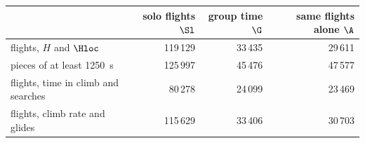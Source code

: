 \begin{tabular}{@{}l r r r@{}}
\toprule
 & solo flights $\Sl$ & group time $\G$ & same flights alone $\A$ \\
\midrule
flights, $H$ and $\Hloc$ & 119\,129 & 33\,435 & 29\,611 \\
pieces of at least 1250~s & 125\,997 & 45\,476 & 47\,577 \\
flights, time in climb and searches & 80\,278 & 24\,099 & 23\,469 \\
flights, climb rate and glides & 115\,629 & 33\,406 & 30\,703 \\
\bottomrule
\end{tabular}
